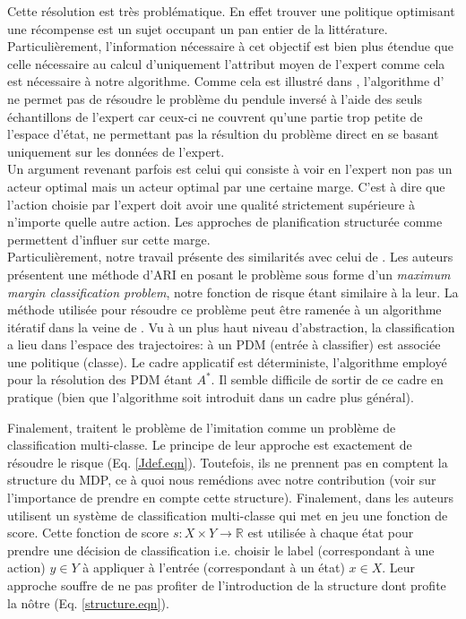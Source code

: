 \documentclass{article}
\begin{document}
Cette résolution est très problématique. En effet trouver une politique optimisant une récompense est un sujet occupant un pan entier de la littérature. Particulièrement, l'information nécessaire à cet objectif est bien plus étendue que celle nécessaire au calcul d'uniquement l'attribut moyen de l'expert comme cela est nécessaire à notre algorithme. Comme cela est illustré dans \cite{klein2011batch}, l'algorithme d'\citet{abbeel2004apprenticeship} ne permet pas de résoudre le problème du pendule inversé à l'aide des seuls échantillons de l'expert car ceux-ci ne couvrent qu'une partie trop petite de l'espace d'état, ne permettant pas la résultion du problème direct en se basant uniquement sur les  données de l'expert.\\

Un argument revenant parfois est celui qui consiste à voir en l'expert non pas un acteur optimal mais un acteur optimal par une certaine marge. C'est à dire que l'action choisie par l'expert doit avoir une qualité strictement supérieure à n'importe quelle autre action. Les approches de planification structurée comme \citet{ratliff2006maximum,ratliff2007imitation, ratliff2007boosting, kolter2008hierarchical} permettent d'influer sur cette marge.\\

Particulièrement, notre travail présente des similarités avec celui de \citet{ratliff2006maximum}. Les auteurs présentent une méthode d'ARI en posant le problème sous forme d'un \emph{maximum margin classification problem}, notre fonction de risque étant similaire à la leur. La méthode utilisée pour résoudre ce problème peut être ramenée à un algorithme itératif dans la veine de \cite{abbeel2004apprenticeship}. Vu à un plus haut niveau d'abstraction, la classification a lieu dans l'espace des trajectoires: à un PDM (entrée à classifier) est associée une politique (classe). Le cadre applicatif est déterministe, l'algorithme employé pour la résolution des PDM étant $A^*$. Il semble difficile de sortir de ce cadre  en pratique (bien que l'algorithme soit introduit dans un cadre plus général).

Finalement, \citep{ratliff2007imitation} traitent le problème de l'imitation comme un problème de classification multi-classe. Le principe de leur approche est exactement de résoudre le risque (Eq. \eqref{Jdef.eqn}). Toutefois, ils ne prennent pas en comptent la structure du MDP, ce à quoi nous remédions avec notre contribution (voir \cite{melo2010learning} sur l'importance de prendre en compte cette structure).
Finalement, dans \citep{ratliff2007imitation} les auteurs utilisent un système de classification multi-classe qui met en jeu une fonction de score. Cette fonction de score $s: X\times Y \rightarrow \mathbb{R}$ est utilisée à chaque état pour prendre une décision de classification i.e. choisir le label (correspondant à une action) $y\in Y$ à appliquer à l'entrée (correspondant à un état) $x\in X$. Leur approche souffre de ne pas profiter de l'introduction de la structure dont profite la nôtre (Eq. \eqref{structure.eqn}).\\
\end{document}
